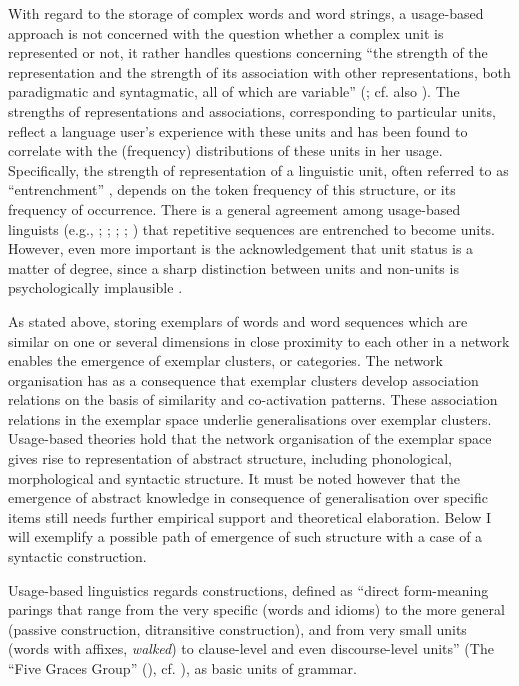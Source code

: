 With regard to the storage of complex words and word strings, a usage-based approach is not concerned with the question whether a complex unit is represented or not, it rather handles questions concerning ``the strength of the representation and the strength of its association with other representations, both paradigmatic and syntagmatic, all of which are variable'' (\citealt[24]{bybee-book-2010}; cf. also \citealt{lieven-2010}). The strengths of representations and associations, corresponding to particular units, reflect a language user's experience with these units and has been found to correlate with the (frequency) distributions of these units in her usage. Specifically, the strength of representation of a linguistic unit, often referred to as “entrenchment” \citep{langacker-foundations-1987,croft-2001,tomasello-constructing-2003,blumenthal}, depends on the token frequency of this structure, or its frequency of occurrence. There is a general agreement among usage-based linguists (e.g., \citealt[59]{langacker-foundations-1987}; \citealt[581]{bybee-scheibman}; \citealt[106--107]{tomasello-constructing-2003}; \citealt[283]{bybee-frequency-2007}; \citealt[68]{blumenthal}) that repetitive sequences are entrenched to become units. However, even more important is the acknowledgement that unit status is a matter of degree, since a sharp distinction between units and non-units is psychologically implausible \citep[59]{langacker-foundations-1987}.

As stated above, storing exemplars of words and word sequences which are similar on one or several dimensions in close proximity to each other in a network enables the emergence of exemplar clusters, or categories. The network organisation has as a consequence that exemplar clusters develop association relations on the basis of similarity and co-activation patterns. These association relations in the exemplar space underlie generalisations over exemplar clusters. Usage-based theories hold that the network organisation of the exemplar space gives rise to representation of abstract structure, including phonological, morphological and syntactic structure. It must be noted however that the emergence of abstract knowledge in consequence of generalisation over specific items still needs further empirical support and theoretical elaboration. Below I will exemplify a possible path of emergence of such structure with a case of a syntactic construction.

Usage-based linguistics regards constructions, defined as ``direct form-mean\-ing parings that range from the very specific (words and idioms) to the more general (passive construction, ditransitive construction), and from very small units (words with affixes, \textit{walked}) to clause-level and even discourse-level units'' (The “Five Graces Group” (\citeyear[5]{five-graces}), cf. \citealt{croft-2001, goldberg-2003, goldberg-2006}), as basic units of grammar.

